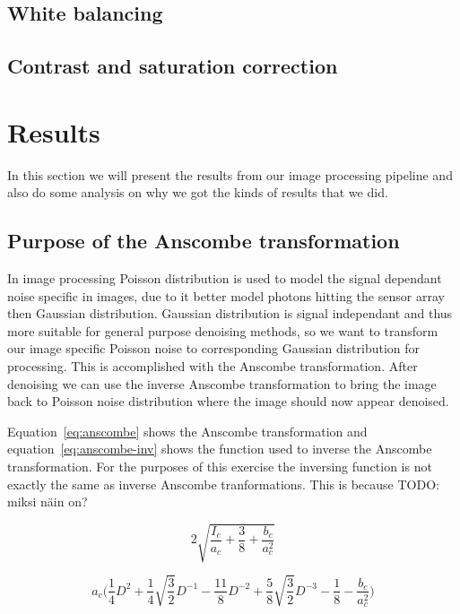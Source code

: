 \documentclass[12pt,a4paper,english
]{tunithesis}
\begin{document}
\section{White balancing}

\section{Contrast and saturation correction}



\chapter{Results}
\label{sec:results}
In this section we will present the results from our image processing pipeline and also do some analysis on why we got the kinds of results that we did.


\section{Purpose of the Anscombe transformation}
In image processing Poisson distribution is used to model the signal dependant noise specific in images, due to it better model photons hitting the sensor array then Gaussian distribution. Gaussian distribution is signal independant and thus more suitable for general purpose denoising methods, so we want to transform our image specific Poisson noise to corresponding Gaussian distribution for processing. This is accomplished with the Anscombe transformation. After denoising we can use the inverse Anscombe transformation to bring the image back to Poisson noise distribution where the image should now appear denoised.

Equation~\ref{eq:anscombe} shows the Anscombe transformation and equation~\ref{eq:anscombe-inv} shows the function used to inverse the Anscombe transformation. For the purposes of this exercise the inversing function is not exactly the same as inverse Anscombe tranformations. This is because TODO: miksi näin on?

\begin{equation}
\label{eq:anscombe}
  2 \sqrt{\frac{I_{c}}{a_{c}} + \frac{3}{8} + \frac{b_{c}}{a_{c}^2}}
\end{equation}

\begin{equation}
\label{eq:anscombe-inv}
  a_{c} \Bigg( \frac{1}{4}D^2 + \frac{1}{4}\sqrt{\frac{3}{2}}D^{-1} - \frac{11}{8}D^{-2} + \frac{5}{8} \sqrt{\frac{3}{2}}D^{-3} - \frac{1}{8} - \frac{b_{c}}{a_{c}^2} \Bigg)
  \end{equation}
\end{document}
